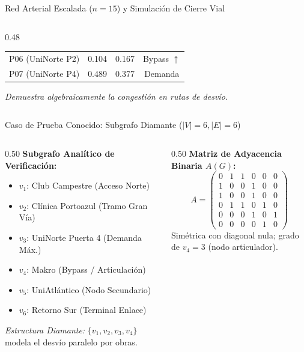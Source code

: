 \documentclass[aspectratio=169,10pt]{beamer}
\begin{document}
\begin{frame}{Red Arterial Escalada ($n=15$) y Simulación de Cierre Vial}
\begin{columns}[T]
\begin{column}{0.48\textwidth}
\begin{tabular}{lccc}
                P06 (UniNorte P2) & 0.104 & 0.167 & Bypass $\uparrow$ \\
                P07 (UniNorte P4) & 0.489 & 0.377 & Demanda \\
                \bottomrule
            \end{tabular}
            \vspace{0.2cm}
            \footnotesize \textit{Demuestra algebraicamente la congestión en rutas de desvío.}
        \end{column}
    \end{columns}
\end{frame}

\begin{frame}{Caso de Prueba Conocido: Subgrafo Diamante ($|V|=6, |E|=6$)}
    \begin{columns}[T]
        \begin{column}{0.50\textwidth}
            \textbf{Subgrafo Analítico de Verificación:}
            \begin{itemize}
                \item $v_1$: Club Campestre (Acceso Norte)
                \item $v_2$: Clínica Portoazul (Tramo Gran Vía)
                \item $v_3$: UniNorte Puerta 4 (Demanda Máx.)
                \item $v_4$: Makro (Bypass / Articulación)
                \item $v_5$: UniAtlántico (Nodo Secundario)
                \item $v_6$: Retorno Sur (Terminal Enlace)
            \end{itemize}
            \textit{Estructura Diamante:} $\{v_1, v_2, v_3, v_4\}$ modela el desvío paralelo por obras.
        \end{column}
        \begin{column}{0.50\textwidth}
            \textbf{Matriz de Adyacencia Binaria $A(G)$:}
            $$A = \begin{pmatrix}
            0 & 1 & 1 & 0 & 0 & 0 \\
            1 & 0 & 0 & 1 & 0 & 0 \\
            1 & 0 & 0 & 1 & 0 & 0 \\
            0 & 1 & 1 & 0 & 1 & 0 \\
            0 & 0 & 0 & 1 & 0 & 1 \\
            0 & 0 & 0 & 0 & 1 & 0
            \end{pmatrix}$$
            \small Simétrica con diagonal nula; grado de $v_4 = 3$ (nodo articulador).
        \end{column}
    \end{columns}
\end{frame}
\end{document}
